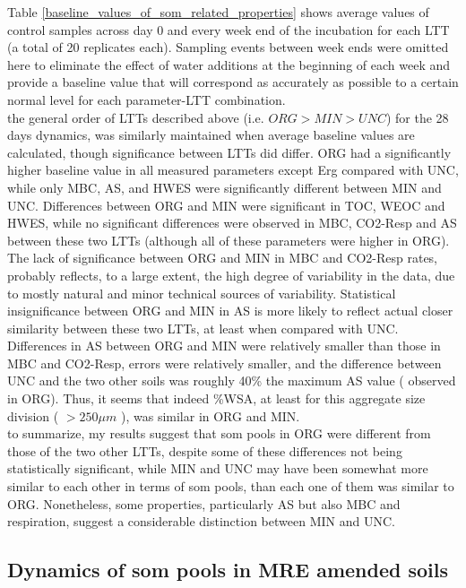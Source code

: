 			Table \ref{baseline_values_of_som_related_properties} shows average values of control samples across day 0 and every week end of the incubation for each LTT (a total of 20 replicates each). Sampling events between week ends were omitted here to eliminate the effect of water additions at the beginning of each week and provide a baseline value that will correspond as accurately as possible to a certain normal level for each parameter-LTT combination.\\
			
			\noindent the general order of LTTs described above (i.e. $ ORG > MIN > UNC $) for the 28 days dynamics, was similarly maintained when average baseline values are calculated, though significance between LTTs did differ.
			ORG had a significantly higher baseline value in all measured parameters except Erg compared with UNC, while only MBC, AS, and HWES were significantly different between MIN and UNC.
			Differences between ORG and MIN were significant in TOC, WEOC and HWES, while no significant differences were observed in MBC, CO2-Resp and AS between these two LTTs (although all of these parameters were higher in ORG).
			The lack of significance between ORG and MIN in MBC and CO2-Resp rates, probably reflects, to a large extent, the high degree of variability in the data, due to mostly natural and minor technical sources of variability.  Statistical insignificance between ORG and MIN in AS is more likely to reflect actual closer similarity between these two LTTs, at least when compared with UNC. Differences in AS between ORG and MIN were relatively smaller than those in MBC and CO2-Resp, errors were relatively smaller, and the difference between UNC and the two other soils was roughly 40\% the maximum AS value ( observed in ORG). Thus, it seems that indeed \%WSA, at least for this aggregate size division ( $ >250\mu m$ ), was similar in ORG and MIN.\\
			to summarize, my results suggest that \gls{som} pools in ORG were different from those of the two other LTTs, despite some of these differences not being statistically significant, while MIN and UNC may have been somewhat more similar to each other in terms of \gls{som} pools, than each one of them was similar to ORG. Nonetheless, some properties, particularly AS but also MBC and respiration, suggest a considerable distinction between MIN and UNC. \\



	\subsection{Dynamics of \gls{som} pools in MRE amended soils}

